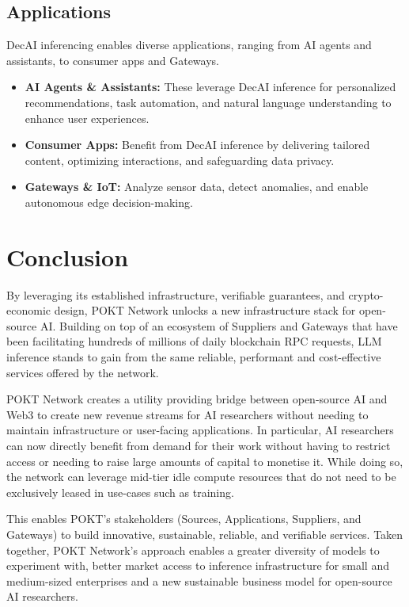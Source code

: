 \documentclass[conference,compsoc]{IEEEtran}
\begin{document}
\subsection{Applications}
DecAI inferencing enables diverse applications, ranging from AI agents and assistants, to consumer apps and Gateways.
\begin{itemize}
    \item \textbf{AI Agents \& Assistants:} These leverage DecAI inference for personalized recommendations, task automation, and natural language understanding to enhance user experiences.

    \item \textbf{Consumer Apps:} Benefit from DecAI inference by delivering tailored content, optimizing interactions, and safeguarding data privacy.

    \item \textbf{Gateways \& IoT:} Analyze sensor data, detect anomalies, and enable autonomous edge decision-making.
\end{itemize}

\section{Conclusion}
By leveraging its established infrastructure, verifiable guarantees, and crypto-economic design, POKT Network unlocks a new infrastructure stack for open-source AI. Building on top of an ecosystem of Suppliers and Gateways that have been facilitating hundreds of millions of daily blockchain RPC requests, LLM inference stands to gain from the same reliable, performant and cost-effective services offered by the network.

POKT Network creates a utility providing bridge between open-source AI and Web3 to create new revenue streams for AI researchers without needing to maintain infrastructure or user-facing applications. In particular, AI researchers can now directly benefit from demand for their work without having to restrict access or needing to raise large amounts of capital to monetise it. While doing so, the network can leverage mid-tier idle compute resources that do not need to be exclusively leased in use-cases such as training. 

This enables POKT's stakeholders (Sources, Applications, Suppliers, and Gateways) to build innovative, sustainable, reliable, and verifiable services. Taken together, POKT Network’s approach enables a greater diversity of models to experiment with, better market access to inference infrastructure for small and medium-sized enterprises and a new sustainable business model for open-source AI researchers.
\end{document}
